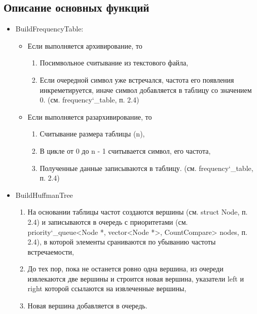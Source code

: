 \documentclass[a4paper,12pt]{article} %
\begin{document}
    \subsection{Описание основных функций}
    \begin{itemize}
        \item
        BuildFrequencyTable:
        \begin{itemize}
            \item 
            Если выполняется архивирование, то
            \begin{enumerate}
                \item
                Посимвольное считывание из текстового файла,
                \item
                Если очередной символ уже встречался, частота его появления инкреметируется, иначе символ 
                добавляется в таблицу со значением 0. (см. frequency\char`_table, п. 2.4) 
            \end{enumerate}
            \item 
            Если выполняется разархивирование, то
            \begin{enumerate}
                \item
                Считывание размера таблицы (n),
                \item
                В цикле от 0 до n - 1 считывается символ, его частота,
                \item
                Полученные данные записываются в таблицу. (см. frequency\char`_table, п. 2.4)                
            \end{enumerate}
        \end{itemize}
        \item BuildHuffmanTree
        \begin{enumerate}
            \item
            На основании таблицы частот создаются вершины (см. struct Node, п. 2.4) и записываются в очередь с 
            приоритетами (см. priority\char`_queue<Node *, vector<Node *>, CountCompare> nodes, п. 2.4), в которой 
            элементы сраниваются по убыванию частоты встречаемости,
            \item
            До тех пор, пока не останется ровно одна вершина, из очереди извлекаются две вершины и строится новая 
            вершина, указатели left и right которой ссылаются на извлеченные вершины, 
            \item
            Новая вершина добавляется в очередь.

\end{enumerate}
\end{itemize}
\end{document}
